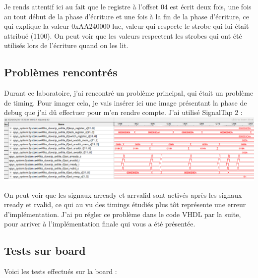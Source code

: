 Je rends attentif ici au fait que le registre à l'offset 04 est écrit deux fois, une fois au tout début de la phase d'écriture et une fois à la fin de la phase d'écriture, ce qui explique la valeur 0xAA240000 lue, valeur qui respecte le strobe qui lui était attribué (1100). On peut voir que les valeurs respectent les strobes qui ont été utilisés lors de l'écriture quand on les lit.

\subsection{Problèmes rencontrés}

Durant ce laboratoire, j'ai rencontré un problème principal, qui était un problème de timing. Pour imager cela, je vais insérer ici une image présentant la phase de debug que j'ai dû effectuer pour m'en rendre compte. J'ai utilisé SignalTap 2 : \\
\includegraphics[scale=0.38]{./images/signaltap.png}

On peut voir que les signaux arready et arrvalid sont activés après les signaux rready et rvalid, ce qui au vu des timings étudiés plus tôt représente une erreur d'implémentation. J'ai pu régler ce problème dans le code VHDL par la suite, pour arriver à l'implémentation finale qui vous a été présentée.

\subsection{Tests sur board}

Voici les tests effectués sur la board : \\

